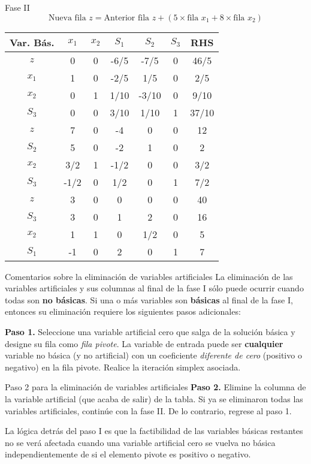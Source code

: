 \documentclass{beamer}
\begin{document}
\begin{frame}{Fase II}
    \[
    \text{Nueva fila } z = \text{Anterior fila } z + (5 \times \text{fila } x_1 + 8 \times \text{fila } x_2)
    \]
    \begin{table}[]
    \centering
    \begin{tabular}{c|c c c c c|c}
    \hline
    \textbf{Var. Bás.} & $x_1$ & $x_2$ & $S_1$ & $S_2$ & $S_3$ & RHS\\
    \hline
    $z$ & 0 & 0 & -6/5 & -7/5 & 0 & 46/5 \\
    $x_1$ & 1 & 0 & -2/5 & 1/5 & 0 & 2/5 \\
    $x_2$ & 0 & 1 & 1/10 & -3/10 & 0 & 9/10 \\
    $S_3$ & 0 & 0 & 3/10 & 1/10 & 1 & 37/10 \\
    \hline
    \hline
    $z$ & 7 & 0 & -4 & 0 & 0 & 12 \\
    $S_2$ & 5 & 0 & -2 & 1 & 0 & 2 \\
    $x_2$ & 3/2 & 1 & -1/2 & 0 & 0 & 3/2 \\
    $S_3$ & -1/2 & 0 & 1/2 & 0 & 1 & 7/2 \\
    \hline
    \hline
    $z$ & 3 & 0 & 0 & 0 & 0 & 40 \\
    $S_3$ & 3 & 0 & 1 & 2 & 0 & 16 \\
    $x_2$ & 1 & 1 & 0 & 1/2 & 0 & 5 \\
    $S_1$ & -1 & 0 & 2 & 0 & 1 & 7 \\
    \end{tabular}
    \end{table}
\end{frame}

\begin{frame}{Comentarios sobre la eliminación de variables artificiales}
    La eliminación de las variables artificiales y sus columnas al final de la fase I sólo puede ocurrir cuando todas son \textbf{no básicas}. Si una o más variables son \textbf{básicas} al final de la fase I, entonces su eliminación requiere los siguientes pasos adicionales:
    
    \textbf{Paso 1.} Seleccione una variable artificial cero que salga de la solución básica y designe su fila como \emph{fila pivote}. La variable de entrada puede ser \textbf{cualquier} variable no básica (y no artificial) con un coeficiente \emph{diferente de cero} (positivo o negativo) en la fila pivote. Realice la iteración simplex asociada.
\end{frame}

\begin{frame}{Paso 2 para la eliminación de variables artificiales}
    \textbf{Paso 2.} Elimine la columna de la variable artificial (que acaba de salir) de la tabla. Si ya se eliminaron todas las variables artificiales, continúe con la fase II. De lo contrario, regrese al paso 1.

    La lógica detrás del paso I es que la factibilidad de las variables básicas restantes no se verá afectada cuando una variable artificial cero se vuelva no básica independientemente de si el elemento pivote es positivo o negativo. 
\end{frame}
\end{document}
